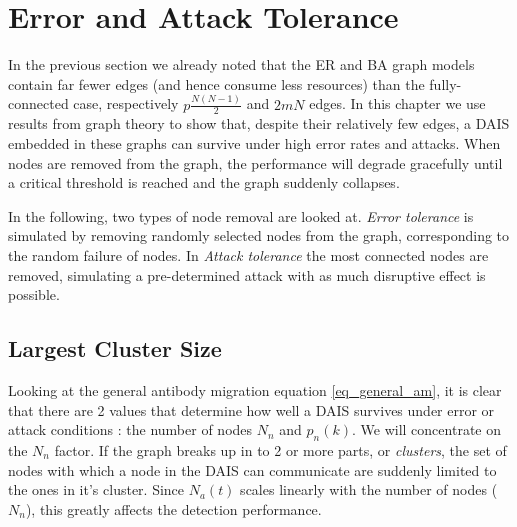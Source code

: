 \documentclass{article}
\begin{document}


\section{Error and Attack Tolerance}
\label{sec_tolerance}
In the previous section we already noted that the ER and BA graph models contain far fewer edges (and hence consume less resources) than the fully-connected case, respectively $p \frac{N(N-1)}{2}$ and $2mN$ edges.
In this chapter we use results from graph theory to show that, despite their relatively few edges, a DAIS embedded in these graphs can survive under high error rates and attacks.
When nodes are removed from the graph, the performance will degrade gracefully until a critical threshold is reached and the graph suddenly collapses.

In the following, two types of node removal are looked at.
{\it Error tolerance} is simulated by removing randomly selected nodes from the graph, corresponding to the random failure of nodes.
In {\it Attack tolerance} the most connected nodes are removed, simulating a pre-determined attack with as much disruptive effect is possible.

\subsection{Largest Cluster Size}
Looking at the general antibody migration equation \ref{eq_general_am}, it is clear that there are 2 values that determine how well a DAIS survives under error or attack conditions : the number of nodes $N_n$ and $p_n(k)$.
We will concentrate on the $N_n$ factor.
If the graph breaks up in to 2 or more parts, or {\it clusters}, the set of nodes with which a node in the DAIS can communicate are suddenly limited to the ones in it's cluster.
Since $N_a(t)$ scales linearly with the number of nodes ($N_n$), this greatly affects the detection performance.
\end{document}

